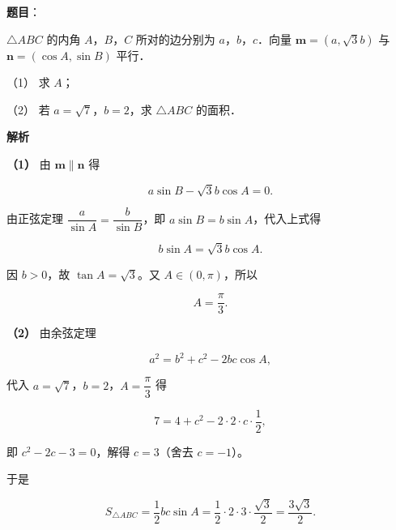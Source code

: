 \begin{answer}

\textbf{题目}：

$\triangle ABC$ 的内角 $A$，$B$，$C$ 所对的边分别为 $a$，$b$，$c$．向量 $\boldsymbol{m}=(a,\sqrt{3}b)$ 与 $\boldsymbol{n}=(\cos A,\sin B)$ 平行．

（1） 求 $A$；

（2） 若 $a=\sqrt{7}$，$b=2$，求 $\triangle ABC$ 的面积．

\textbf{解析}

\textbf{（1）} 由 $\boldsymbol{m}\parallel\boldsymbol{n}$ 得

\nopagebreak[4]
\[
a\sin B-\sqrt{3}b\cos A=0.
\]

由正弦定理 $\dfrac{a}{\sin A}=\dfrac{b}{\sin B}$，即 $a\sin B=b\sin A$，代入上式得

\nopagebreak[4]
\[
b\sin A=\sqrt{3}b\cos A.
\]

因 $b>0$，故 $\tan A=\sqrt{3}$。又 $A\in(0,\pi)$，所以

\nopagebreak[4]
\[
A=\frac{\pi}{3}.
\]

\textbf{（2）} 由余弦定理

\nopagebreak[4]
\[
a^{2}=b^{2}+c^{2}-2bc\cos A,
\]

代入 $a=\sqrt{7}$，$b=2$，$A=\dfrac{\pi}{3}$ 得

\nopagebreak[4]
\[
7=4+c^{2}-2\cdot 2\cdot c\cdot\frac{1}{2},
\]

即 $c^{2}-2c-3=0$，解得 $c=3$（舍去 $c=-1$）。

于是

\nopagebreak[4]
\[
S_{\triangle ABC}=\frac{1}{2}bc\sin A=\frac{1}{2}\cdot 2\cdot 3\cdot\frac{\sqrt{3}}{2}=\frac{3\sqrt{3}}{2}.
\]



\end{answer}
